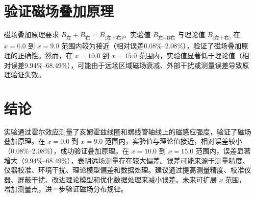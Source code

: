 \documentclass[12pt]{article}
\begin{document}
\begin{CJK}{UTF8}{gbsn}
\section{验证磁场叠加原理}
磁场叠加原理要求 \( B_{\text{左}} + B_{\text{右}} = B_{\text{(左＋右)}} \)。实验值 \( B_{\text{左+B右}} \) 与理论值 \( B_{\text{(左＋右)}} \) 在 \( x = 0.0 \) 到 \( x = 9.0 \) 范围内较为接近（相对误差0.08\%–2.08\%），验证了磁场叠加原理的正确性。然而，在 \( x = 10.0 \) 到 \( x = 15.0 \) 范围内，实验值显著低于理论值（相对误差9.94\%–68.49\%），可能由于远场区域磁场衰减、外部干扰或测量误差导致原理验证失效。

\section{结论}
实验通过霍尔效应测量了亥姆霍兹线圈和螺线管轴线上的磁感应强度，验证了磁场叠加原理。在 \( x = 0.0 \) 到 \( x = 9.0 \) 范围内，实验值与理论值接近，相对误差较小（0.08\%–2.08\%），成功验证叠加原理。在 \( x = 10.0 \) 到 \( x = 15.0 \) 范围内，误差显著增大（9.94\%–68.49\%），表明远场测量存在较大偏差。误差可能来源于测量精度、仪器校准、环境干扰、理论模型偏差和数据处理。建议通过提高测量精度、校准仪器、屏蔽干扰、改进理论模型和优化数据处理来减小误差。未来可扩展 \( x \) 范围，增加测量点，进一步验证磁场分布规律。

\end{CJK}
\end{document}

